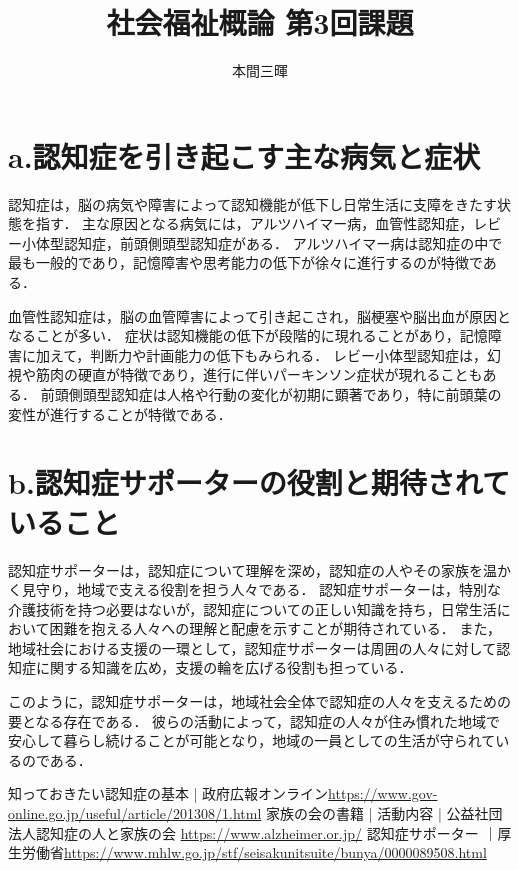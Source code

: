 \documentclass[titlepage,a4paper]{jsarticle}
\title{社会福祉概論 第3回課題}
\author{本間三暉}
\begin{document}
\maketitle
\section{a.認知症を引き起こす主な病気と症状}
認知症は，脳の病気や障害によって認知機能が低下し日常生活に支障をきたす状態を指す．
主な原因となる病気には，アルツハイマー病，血管性認知症，レビー小体型認知症，前頭側頭型認知症がある．
アルツハイマー病は認知症の中で最も一般的であり，記憶障害や思考能力の低下が徐々に進行するのが特徴である\cite{3_a_1}．

血管性認知症は，脳の血管障害によって引き起こされ，脳梗塞や脳出血が原因となることが多い．
症状は認知機能の低下が段階的に現れることがあり，記憶障害に加えて，判断力や計画能力の低下もみられる．
レビー小体型認知症は，幻視や筋肉の硬直が特徴であり，進行に伴いパーキンソン症状が現れることもある．
前頭側頭型認知症は人格や行動の変化が初期に顕著であり，特に前頭葉の変性が進行することが特徴である\cite{3_a_2}．

\section{b.認知症サポーターの役割と期待されていること}
認知症サポーターは，認知症について理解を深め，認知症の人やその家族を温かく見守り，地域で支える役割を担う人々である．
認知症サポーターは，特別な介護技術を持つ必要はないが，認知症についての正しい知識を持ち，日常生活において困難を抱える人々への理解と配慮を示すことが期待されている．
また，地域社会における支援の一環として，認知症サポーターは周囲の人々に対して認知症に関する知識を広め，支援の輪を広げる役割も担っている\cite{3_b}．

このように，認知症サポーターは，地域社会全体で認知症の人々を支えるための要となる存在である．
彼らの活動によって，認知症の人々が住み慣れた地域で安心して暮らし続けることが可能となり，地域の一員としての生活が守られているのである．
\begin{thebibliography}{99}
知っておきたい認知症の基本 | 政府広報オンライン\url{https://www.gov-online.go.jp/useful/article/201308/1.html}
家族の会の書籍 | 活動内容 | 公益社団法人認知症の人と家族の会 \url{https://www.alzheimer.or.jp/}
認知症サポーター ｜厚生労働省\url{https://www.mhlw.go.jp/stf/seisakunitsuite/bunya/0000089508.html}
\end{thebibliography}
\end{document}
